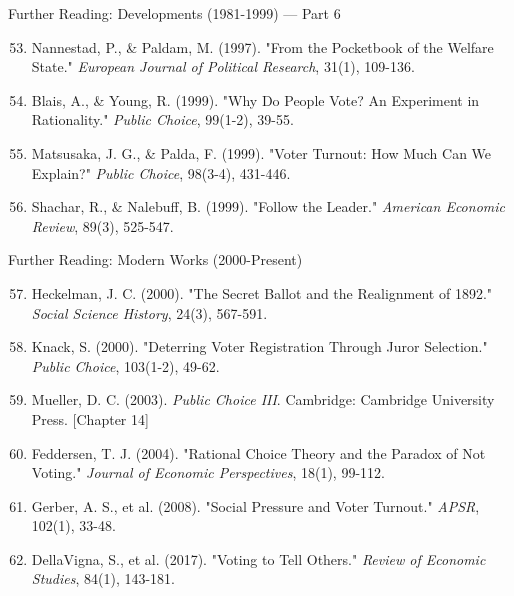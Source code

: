 \documentclass[10pt]{beamer}
\begin{document}
\begin{frame}{Further Reading: Developments (1981-1999) — Part 6}
\footnotesize
\begin{enumerate}
\setcounter{enumi}{52}
\item Nannestad, P., \& Paldam, M. (1997). "From the Pocketbook of the Welfare State." \emph{European Journal of Political Research}, 31(1), 109-136.
\item Blais, A., \& Young, R. (1999). "Why Do People Vote? An Experiment in Rationality." \emph{Public Choice}, 99(1-2), 39-55.
\item Matsusaka, J. G., \& Palda, F. (1999). "Voter Turnout: How Much Can We Explain?" \emph{Public Choice}, 98(3-4), 431-446.
\item Shachar, R., \& Nalebuff, B. (1999). "Follow the Leader." \emph{American Economic Review}, 89(3), 525-547.
\end{enumerate}
\end{frame}

\begin{frame}{Further Reading: Modern Works (2000-Present)}
\footnotesize
\begin{enumerate}
\setcounter{enumi}{56}
\item Heckelman, J. C. (2000). "The Secret Ballot and the Realignment of 1892." \emph{Social Science History}, 24(3), 567-591.
\item Knack, S. (2000). "Deterring Voter Registration Through Juror Selection." \emph{Public Choice}, 103(1-2), 49-62.
\item Mueller, D. C. (2003). \emph{Public Choice III}. Cambridge: Cambridge University Press. [Chapter 14]
\item Feddersen, T. J. (2004). "Rational Choice Theory and the Paradox of Not Voting." \emph{Journal of Economic Perspectives}, 18(1), 99-112.
\item Gerber, A. S., et al. (2008). "Social Pressure and Voter Turnout." \emph{APSR}, 102(1), 33-48.
\item DellaVigna, S., et al. (2017). "Voting to Tell Others." \emph{Review of Economic Studies}, 84(1), 143-181.
\end{enumerate}
\end{frame}
\end{document}
